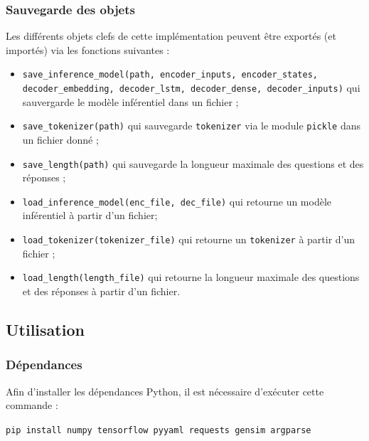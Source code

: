 \documentclass[10pt,a4paper]{article}
\begin{document}
\subsubsection{Sauvegarde des objets}
Les différents objets clefs de cette implémentation peuvent être exportés (et importés) via les fonctions suivantes :
\begin{itemize}
	\item \texttt{save\_inference\_model(path, encoder\_inputs, encoder\_states, decoder\_embedding, decoder\_lstm, decoder\_dense, decoder\_inputs)} qui sauvergarde le modèle inférentiel dans un fichier ;
	\item \texttt{save\_tokenizer(path)} qui sauvegarde \texttt{tokenizer} via le module \texttt{pickle} dans un fichier donné ;
	\item \texttt{save\_length(path)} qui sauvegarde la longueur maximale des questions et des réponses ;
	\item \texttt{load\_inference\_model(enc\_file, dec\_file)} qui retourne un modèle inférentiel à partir d'un fichier;
	\item \texttt{load\_tokenizer(tokenizer\_file)} qui retourne un \texttt{tokenizer} à partir d'un fichier ;
	\item \texttt{load\_length(length\_file)} qui retourne la longueur maximale des questions et des réponses à partir d'un fichier.
\end{itemize}

\subsection{Utilisation}
\subsubsection{Dépendances}

Afin d'installer les dépendances Python, il est nécessaire d’exécuter cette commande :
\begin{center}
	\texttt{pip install numpy tensorflow pyyaml requests gensim argparse}
\end{center}
\end{document}
